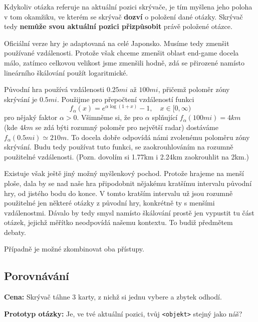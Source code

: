 
Kdykoliv otázka referuje na aktuální pozici skrývače, je tím myšlena jeho poloha v tom okamžiku, ve kterém se skrývač \textbf{dozví} o položení dané otázky. Skrývač tedy \textbf{nemůže svou aktuální pozici přizpůsobit} právě položené otázce.

\begin{reasoning}
	Oficiální verze hry je adaptovaná na celé Japonsko. Musíme tedy zmenšit používané vzdálenosti. Protože však chceme zmenšit oblast end-game docela málo, zatímco celkovou velikost jsme zmenšili hodně, zdá se přirozené namísto lineárního škálování použít logaritmické.
	
	Původní hra používá vzdálenosti $0.25mi$ až $100mi$, přičemž poloměr zóny skrývání je $0.5mi$. Použijme pro přepočtení vzdáleností funkci
	\begin{equation*}
		f_\alpha(x) = e^{\alpha\log(1+x)} - 1,\quad x \in [0, \infty)
	\end{equation*}
	pro nějaký faktor $\alpha > 0$. Všimněme si, že pro $\alpha$ splňující $f_\alpha(100mi) = 4km$ (kde $4km$ se zdá býti rozumný poloměr pro největší radar) dostáváme $f_\alpha(0.5mi) \simeq 210m$. To docela dobře odpovídá námi zvolenému poloměru zóny skrývání. Budu tedy používat tuto funkci, se zaokrouhlováním na rozumně použitelné vzdálenosti. (Pozn. dovolím si 1.77km i 2.24km zaokrouhlit na 2km.)
	
	Existuje však ještě jiný možný myšlenkový pochod. Protože hrajeme na menší ploše, dala by se nad naše hra připodobnit nějakému kratšímu intervalu původní hry, od jistého bodu do konce. V tomto kratším intervalu už jsou rozumně použitelné jen některé otázky z původní hry, konkrétně ty s menšími vzdálenostmi. Dávalo by tedy smysl namísto škálování prostě jen vypustit tu část otázek, jejichž měřítko neodpovídá našemu kontextu. To budiž předmětem debaty.
	
	Případně je možné zkombinovat oba přístupy.
\end{reasoning}

\subsection{Porovnávání}

\textbf{Cena:} Skrývač táhne 3 karty, z nichž si jednu vybere a zbytek odhodí.

\textbf{Prototyp otázky:} Je, ve tvé aktuální pozici, tvůj \verb|<objekt>| stejný jako náš?

